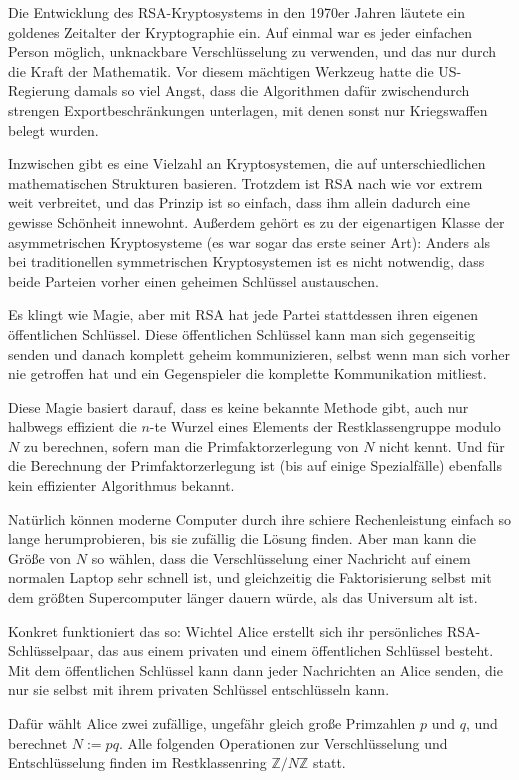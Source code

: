 \documentclass{article}
\newcommand{\Z}{\mathbb{Z}}
\begin{document}
Die Entwicklung des RSA-Kryptosystems in den 1970er Jahren läutete ein goldenes Zeitalter der Kryptographie ein. Auf einmal war es jeder einfachen Person möglich, unknackbare Verschlüsselung zu verwenden, und das nur durch die Kraft der Mathematik. Vor diesem mächtigen Werkzeug hatte die US-Regierung damals so viel Angst, dass die Algorithmen dafür zwischendurch strengen Exportbeschränkungen unterlagen, mit denen sonst nur Kriegswaffen belegt wurden.

Inzwischen gibt es eine Vielzahl an Kryptosystemen, die auf unterschiedlichen mathematischen Strukturen basieren. Trotzdem ist RSA nach wie vor extrem weit verbreitet, und das Prinzip ist so einfach, dass ihm allein dadurch eine gewisse Schönheit innewohnt. Außerdem gehört es zu der eigenartigen Klasse der asymmetrischen Kryptosysteme (es war sogar das erste seiner Art): Anders als bei traditionellen symmetrischen Kryptosystemen ist es nicht notwendig, dass beide Parteien vorher einen geheimen Schlüssel austauschen.

Es klingt wie Magie, aber mit RSA hat jede Partei stattdessen ihren eigenen öffentlichen Schlüssel. Diese öffentlichen Schlüssel kann man sich gegenseitig senden und danach komplett geheim kommunizieren, selbst wenn man sich vorher nie getroffen hat und ein Gegenspieler die komplette Kommunikation mitliest.

Diese Magie basiert darauf, dass es keine bekannte Methode gibt, auch nur halbwegs effizient die $n$-te Wurzel eines Elements der Restklassengruppe modulo $N$ zu berechnen, sofern man die Primfaktorzerlegung von $N$ nicht kennt. Und für die Berechnung der Primfaktorzerlegung ist (bis auf einige Spezialfälle) ebenfalls kein effizienter Algorithmus bekannt. 

Natürlich können moderne Computer durch ihre schiere Rechenleistung einfach so lange herumprobieren, bis sie zufällig die Lösung finden. Aber man kann die Größe von $N$ so wählen, dass die Verschlüsselung einer Nachricht auf einem normalen Laptop sehr schnell ist, und gleichzeitig die Faktorisierung selbst mit dem größten Supercomputer länger dauern würde, als das Universum alt ist.

Konkret funktioniert das so: Wichtel Alice erstellt sich ihr persönliches RSA-Schlüsselpaar, das aus einem privaten und einem öffentlichen Schlüssel besteht. Mit dem öffentlichen Schlüssel kann dann jeder Nachrichten an Alice senden, die nur sie selbst mit ihrem privaten Schlüssel entschlüsseln kann.

Dafür wählt Alice zwei zufällige, ungefähr gleich große Primzahlen $p$ und $q$, und berechnet $N := pq$. Alle folgenden Operationen zur Verschlüsselung und Entschlüsselung finden im Restklassenring $\Z/{N\Z}$ statt.
\end{document}
